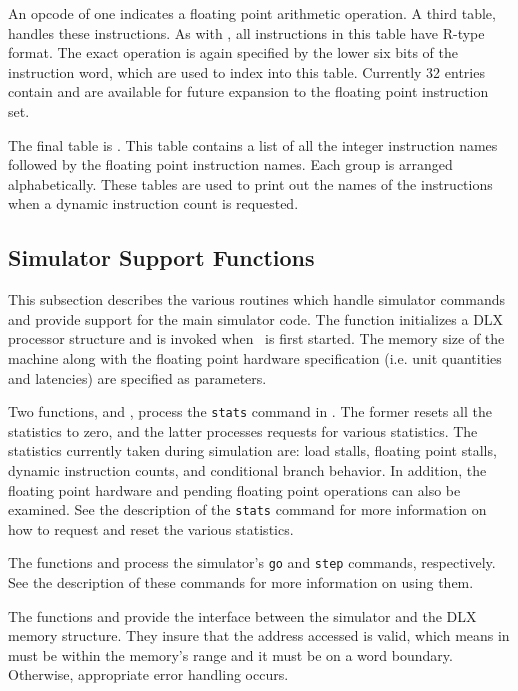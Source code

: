 An opcode of one indicates a floating point arithmetic operation.  A
third table,  handles these instructions.  As with
, all instructions in this table have R-type format.
The exact operation is again specified by the lower six bits of the
instruction word, which are used to index into this table.  Currently
32 entries contain  and are available for future expansion
to the floating point instruction set.

The final table is .  This table contains a list of all
the integer instruction names followed by the floating point instruction names.
Each group is arranged alphabetically.  These tables are used to print out
the names of the instructions when a dynamic instruction count is requested.

\subsection{Simulator Support Functions}

This subsection describes the various routines which handle simulator
commands and provide support for the main simulator code.  The function
 initializes a DLX processor structure and is invoked when
\dlxsim\ is first started.  The memory size of the machine along with
the floating point hardware specification (i.e. unit quantities and
latencies) are specified as parameters.

Two functions,  and , process the
{\tt stats} command in \dlxsim.  The former resets all the statistics
to zero, and the latter processes requests for various statistics.  The
statistics currently taken during simulation are:  load stalls, floating
point stalls, dynamic instruction counts, and conditional branch behavior.
In addition, the floating point hardware and pending floating point operations
can also be examined.  See the description of the {\tt stats} command
for more information on how to request and reset the various statistics.

The functions  and  process the simulator's
{\tt go} and {\tt step} commands, respectively.  See the description of these
commands for more information on using them.

The functions  and  provide the interface
between the simulator and the DLX memory structure.  They insure that the
address accessed is valid, which means in must be within the memory's
range and it must be on a word boundary.  Otherwise, appropriate error
handling occurs.

